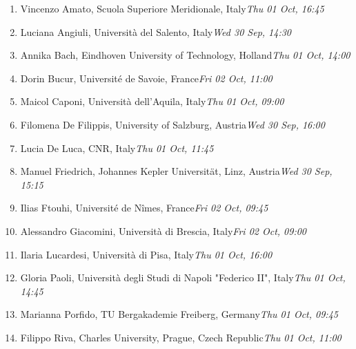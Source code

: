 \documentclass[a4paper,11pt]{article}
\begin{document}
\begin{enumerate}\setlength{\itemsep}{1pt}
	\item Vincenzo Amato, Scuola Superiore Meridionale, Italy\newline\textit{Thu 01 Oct, 16:45}
	\item Luciana Angiuli, Università del Salento, Italy\newline\textit{Wed 30 Sep, 14:30}
	\item Annika Bach, Eindhoven University of Technology, Holland\newline\textit{Thu 01 Oct, 14:00}
	\item Dorin Bucur, Université de Savoie, France\newline\textit{Fri 02 Oct, 11:00}
	\item Maicol Caponi, Università dell'Aquila, Italy\newline\textit{Thu 01 Oct, 09:00}
	\item Filomena De Filippis, University of Salzburg, Austria\newline\textit{Wed 30 Sep, 16:00}
	\item Lucia De Luca, CNR, Italy\newline\textit{Thu 01 Oct, 11:45}
	\item Manuel Friedrich, Johannes Kepler Universität, Linz, Austria\newline\textit{Wed 30 Sep, 15:15}
	\item Ilias Ftouhi, Université de Nîmes, France\newline\textit{Fri 02 Oct, 09:45}
	\item Alessandro Giacomini, Università di Brescia, Italy\newline\textit{Fri 02 Oct, 09:00}
	\item Ilaria Lucardesi, Università di Pisa, Italy\newline\textit{Thu 01 Oct, 16:00}
	\item Gloria Paoli, Università degli Studi di Napoli "Federico II", Italy\newline\textit{Thu 01 Oct, 14:45}
	\item Marianna Porfido, TU Bergakademie Freiberg, Germany\newline\textit{Thu 01 Oct, 09:45}
	\item Filippo Riva, Charles University, Prague, Czech Republic\newline\textit{Thu 01 Oct, 11:00}
\end{enumerate}

\vspace{0.2 cm}
\end{document}
